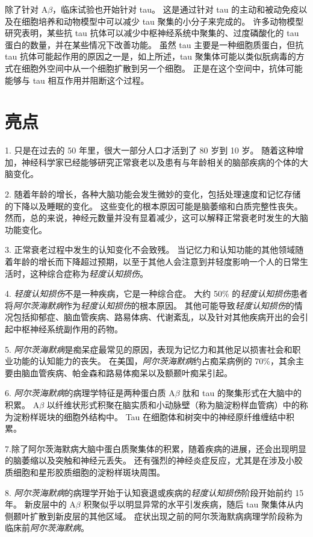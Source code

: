 除了针对 A$\beta$，临床试验也开始针对 tau。
这是通过针对 tau 的主动和被动免疫以及在细胞培养和动物模型中可以减少 tau 聚集的小分子来完成的。
许多动物模型研究表明，某些抗 tau 抗体可以减少中枢神经系统中聚集的、过度磷酸化的 tau 蛋白的数量，并在某些情况下改善功能。
虽然 tau 主要是一种细胞质蛋白，但抗 tau 抗体可能起作用的原因之一是，如上所述，tau 聚集体可能以类似朊病毒的方式在细胞外空间中从一个细胞扩散到另一个细胞。
正是在这个空间中，抗体可能能够与 tau 相互作用并阻断这个过程。



\section{亮点}

1. 只是在过去的 50 年里，很大一部分人口才活到了 80 岁到 10 岁。
随着这种增加，神经科学家已经能够研究正常衰老以及患有与年龄相关的脑部疾病的个体的大脑变化。


2. 随着年龄的增长，各种大脑功能会发生微妙的变化，包括处理速度和记忆存储的下降以及睡眠的变化。
这些变化的根本原因可能是脑萎缩和白质完整性丧失。
然而，总的来说，神经元数量并没有显着减少，这可以解释正常衰老时发生的大脑功能变化。


3. 正常衰老过程中发生的认知变化不会致残。
当记忆力和认知功能的其他领域随着年龄的增长而下降超过预期，以至于其他人会注意到并轻度影响一个人的日常生活时，这种综合症称为\textit{轻度认知损伤}。


4. \textit{轻度认知损伤}不是一种疾病，它是一种综合症。
大约 50\% 的\textit{轻度认知损伤}患者将\textit{阿尔茨海默病}作为\textit{轻度认知损伤}的根本原因。
其他可能导致\textit{轻度认知损伤}的情况包括抑郁症、脑血管疾病、路易体病、代谢紊乱，以及针对其他疾病开出的会引起中枢神经系统副作用的药物。


5. \textit{阿尔茨海默病}是痴呆症最常见的原因，表现为记忆力和其他足以损害社会和职业功能的认知能力的丧失。
在美国，\textit{阿尔茨海默病}约占痴呆病例的 70\%，其余主要由脑血管疾病、帕金森和路易体痴呆以及额颞叶痴呆引起。


6. \textit{阿尔茨海默病}的病理学特征是两种蛋白质 A$\beta$ 肽和 tau 的聚集形式在大脑中的积累。
A$\beta$ 以纤维状形式积聚在脑实质和小动脉壁（称为脑淀粉样血管病）中的称为淀粉样斑块的细胞外结构中。
Tau 在细胞体和树突中的神经原纤维缠结中积累。


7.除了阿尔茨海默病大脑中蛋白质聚集体的积累，随着疾病的进展，还会出现明显的脑萎缩以及突触和神经元丢失。
还有强烈的神经炎症反应，尤其是在涉及小胶质细胞和星形胶质细胞的淀粉样斑块周围。


8. \textit{阿尔茨海默病}的病理学开始于认知衰退或疾病的\textit{轻度认知损伤}阶段开始前约 15 年。
新皮层中的 A$\beta$ 积聚似乎以明显异常的水平引发疾病，随后 tau 聚集体从内侧颞叶扩散到新皮层的其他区域。
症状出现之前的阿尔茨海默病病理学阶段称为临床前\textit{阿尔茨海默病}。



